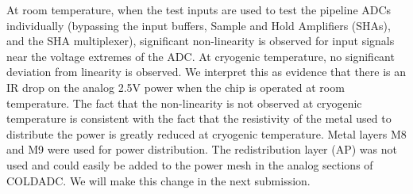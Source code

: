 \label{sec:5.6}

%
%

At room temperature, when the test inputs are used to test the pipeline ADCs individually (bypassing the input buffers, Sample and Hold Amplifiers (SHAs), and the SHA multiplexer), significant non-linearity is observed for input signals near the voltage extremes of the ADC.  At cryogenic temperature, no significant deviation from linearity is observed.  We interpret this as evidence that there is an IR drop on the analog 2.5V power when the chip is operated at room temperature.  The fact that the non-linearity is not observed at cryogenic temperature is consistent with the fact that the resistivity of the metal used to distribute the power is greatly reduced at cryogenic temperature. 
Metal layers M8 and M9 were used for power distribution.  The redistribution layer (AP) was not used and could easily be added to the power mesh in the analog sections of COLDADC.  We will make this change in the next submission.